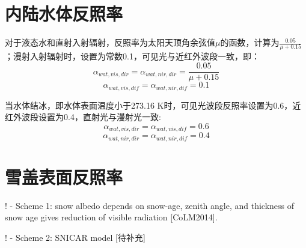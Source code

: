 \section{内陆水体反照率}
对于液态水和直射入射辐射，反照率为太阳天顶角余弦值$\mu$的函数，计算为$\frac{0.05}{\mu+0.15}$；漫射入射辐射时，设置为常数0.1，可见光与近红外波段一致，即：
%
\begin{equation}
\alpha_{wat,vis,dir}=\alpha_{wat,nir,dir}= \frac {0.05}{\mu+0.15}
\end{equation}
%
\begin{equation}
\alpha_{wat,vis,dif}=\alpha_{wat,nir,dif}=0.1
\end{equation}

当水体结冰，即水体表面温度小于273.16 K时，可见光波段反照率设置为0.6，近红外波段设置为0.4，直射光与漫射光一致:
%
\begin{equation}
\alpha_{wat,vis,dir}=\alpha_{wat,vis,dif}=0.6
\end{equation}
%
\begin{equation}
\alpha_{wat,nir,dir}=\alpha_{wat,nir,dif}=0.4
\end{equation}

\section{雪盖表面反照率}

!    - Scheme 1: snow albedo depends on snow-age, zenith angle, and thickness
                 of snow age gives reduction of visible radiation [CoLM2014].

!    - Scheme 2: SNICAR model [待补充]

